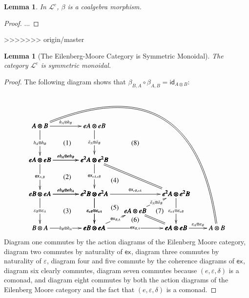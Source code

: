 \documentclass{article}
\newtheorem{lemma}[theorem]{Lemma}
\newcommand{\cat}[1]{\mathcal{#1}}
\newcommand{\id}[0]{\mathsf{id}}
\newcommand{\e}[1]{\mathsf{ex}_{#1}}
\begin{document}
\begin{lemma}
  \label{lemma:beta-coalgebra-morph}
  In $\cat{L}^e$, $\beta$ is a coalgebra morphism.
\end{lemma}
\begin{proof}
  ...
\end{proof}
>>>>>>> origin/master

\begin{lemma}[The Eilenberg-Moore Category is Symmetric Monoidal]
  \label{lemma:the_eilenberg-moore_category_is_symmetric_monoidal}
  The category $\cat{L}^e$ is symmetric monoidal.
\end{lemma}
\begin{proof}
  The following diagram shows that $\beta_{B,A} \circ \beta_{A,B} = \id_{A \otimes B}$:
  \[
  \bfig
  \square|amma|<800,500>[
    A \otimes B`
    eA \otimes eB`
    eA \otimes eB`
    e^2A \otimes e^2 B;
    h_A \otimes h_B`
    h_A \otimes h_B`
    \delta_A \otimes \delta_B`
    eh_A \otimes eh_B]

  \square(0,-500)|amma|<800,500>[
    eA \otimes eB`
    e^2A \otimes e^2B`
    eB \otimes eA`
    e^2B \otimes e^2A;
    eh_A \otimes eh_B`
    \e{A,B}`
    \e{eA,eB}`
    eh_B \otimes eh_A]

  \square(0,-1000)|ammm|<800,500>[
    eB \otimes eA`
    e^2B \otimes e^2A`
    B \otimes A`
    eB \otimes eA;
    eh_B \otimes eh_A`
    \varepsilon_B \otimes \varepsilon_A`
    \varepsilon_{eB} \otimes \varepsilon_{eA}`
    h_B \otimes h_A]

  \square(800,-1000)|ammm|<1200,500>[
    e^2B \otimes e^2A`
    e^2A \otimes e^2B`
    eB \otimes eA`
    eA \otimes eB;
    \e{eB,eA}`
    \varepsilon_{eB} \otimes \varepsilon_{eA}`
    \varepsilon_{eA} \otimes \varepsilon_{eB}`
    \e{B,A}]

  \Atriangle(800,-1000)|mmm|/<-`=`/<600,250>[
    eA \otimes eB`
    eB \otimes eA`
    eA \otimes eB;
    \e{B,A}``]

  \morphism(1400,-750)|m|<600,250>[
    eA \otimes eB`
    e^2A \otimes e^2B;
    \delta_A \otimes \delta_B]

  \btriangle(800,-500)|mmm|/`=`/<1200,500>[
    e^2A \otimes e^2B`
    e^2B \otimes e^2A`
    e^2A \otimes e^2B;``]

  \morphism(2000,-1000)<600,0>[
    eA \otimes eB`
    A \otimes B;
    \varepsilon_A \otimes \varepsilon_B]

  \morphism(0,500)/{@{=}@/^10em/}/<2600,-1500>[
    A \otimes B`
    A \otimes B;]

  \place(400,250)[(1)]
  \place(400,-250)[(2)]
  \place(400,-750)[(3)]
  \place(1100,-300)[(4)]
  \place(1100,-700)[(5)]
  \place(1400,-880)[(6)]
  \place(1760,-750)[(7)]
  \place(1400,250)[(8)]
  \efig
  \]
  Diagram one commutes by the action diagrams of the Eilenberg Moore
  category, diagram two commutes by naturality of $\e{}$, diagram
  three commutes by naturality of $\varepsilon$, diagram four and five
  commute by the coherence diagrams of $\e{}$, diagram six clearly
  commutes, diagram seven commutes because $(e,\varepsilon,\delta)$ is
  a comonad, and diagram eight commutes by both the action diagrams of
  the Eilenberg Moore category and the fact that
  $(e,\varepsilon,\delta)$ is a comonad.
  

\end{proof}
\end{document}
